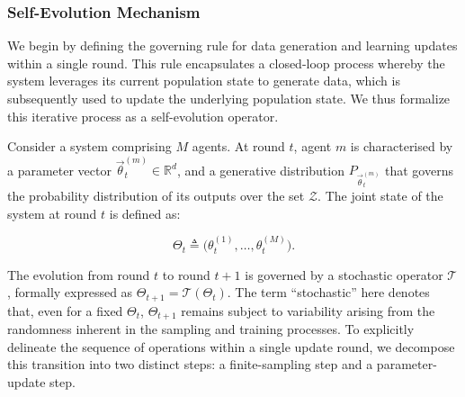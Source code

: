 \subsubsection{Self-Evolution Mechanism}\label{sec:2-4-1-self-evolution-mechanism}

We begin by defining the governing rule for data generation and learning updates within a single round. This rule encapsulates a closed-loop process whereby the system leverages its current population state to generate data, which is subsequently used to update the underlying population state. 
We thus formalize this iterative process as a self-evolution operator.

\begin{definition}\label{def:2-4-self-evolution-operator}

Consider a system comprising $M$ agents. 
At round $t$, agent $m$ is characterised by a parameter vector $\vec{\theta}_t^{(m)} \in \mathbb{R}^d$, and a generative distribution $P_{\vec{\theta}_t^{(m)}}$ that governs the probability distribution of its outputs over the set $\mathcal{Z}$. 
The joint state of the system at round $t$ is defined as:


\[
\Theta_t \triangleq \bigl(\theta_t^{(1)},\dots,\theta_t^{(M)}\bigr).
\]

The evolution from round $t$ to round $t+1$ is governed by a stochastic operator $\mathcal{T}$, formally expressed as $\Theta_{t+1} = \mathcal{T}(\Theta_t)$. The term ``stochastic'' here denotes that, even for a fixed $\Theta_t$, $\Theta_{t+1}$ remains subject to variability arising from the randomness inherent in the sampling and training processes. To explicitly delineate the sequence of operations within a single update round, we decompose this transition into two distinct steps: a finite-sampling step and a parameter-update step.



\end{definition}
